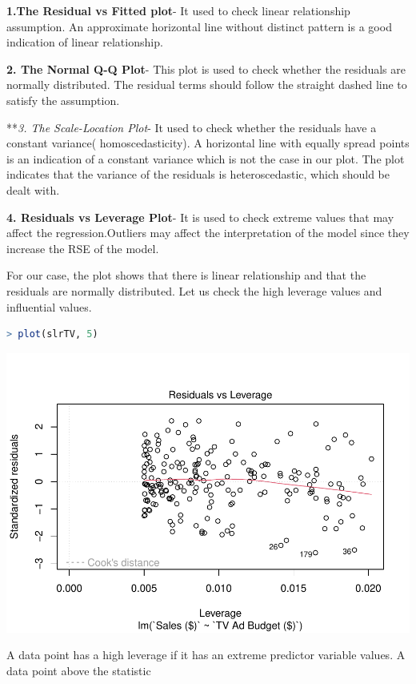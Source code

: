 \documentclass[
]{article}
\begin{document}
\textbf{1.The Residual vs Fitted plot}- It used to check linear
relationship assumption. An approximate horizontal line without distinct
pattern is a good indication of linear relationship.

\textbf{2. The Normal Q-Q Plot}- This plot is used to check whether the
residuals are normally distributed. The residual terms should follow the
straight dashed line to satisfy the assumption.

**\emph{3. The Scale-Location Plot}- It used to check whether the
residuals have a constant variance( homoscedasticity). A horizontal line
with equally spread points is an indication of a constant variance which
is not the case in our plot. The plot indicates that the variance of the
residuals is heteroscedastic, which should be dealt with.

\textbf{4. Residuals vs Leverage Plot}- It is used to check extreme
values that may affect the regression.Outliers may affect the
interpretation of the model since they increase the RSE of the model.

For our case, the plot shows that there is linear relationship and that
the residuals are normally distributed. Let us check the high leverage
values and influential values.

\begin{lstlisting}[language=R]
> plot(slrTV, 5)
\end{lstlisting}

\includegraphics{LinearRegression_files/figure-latex/unnamed-chunk-17-1.pdf}

A data point has a high leverage if it has an extreme predictor variable
values. A data point above the statistic
\end{document}
